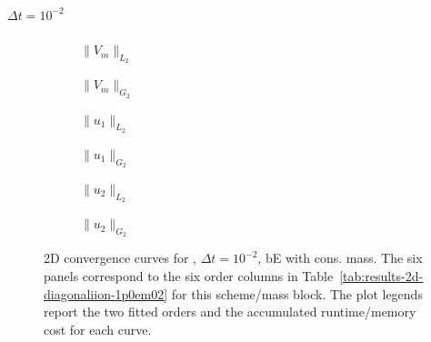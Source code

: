 \subsubsection{}
\paragraph{$\Delta t=10^{-2}$}

\begin{figure}[p]
\centering
\begin{subfigure}{0.485\linewidth}
\centering
{}
\caption{$\|V_m\|_{L_2}$}
\label{fig:results-2d-diagonaliion-1p0em02-backwardeuler-consistent-a}
\end{subfigure}
\hfill
\begin{subfigure}{0.485\linewidth}
\centering
{}
\caption{$\|V_m\|_{G_2}$}
\label{fig:results-2d-diagonaliion-1p0em02-backwardeuler-consistent-b}
\end{subfigure}
\par\vspace{0.8em}
\begin{subfigure}{0.485\linewidth}
\centering
{}
\caption{$\|u_1\|_{L_2}$}
\label{fig:results-2d-diagonaliion-1p0em02-backwardeuler-consistent-c}
\end{subfigure}
\hfill
\begin{subfigure}{0.485\linewidth}
\centering
{}
\caption{$\|u_1\|_{G_2}$}
\label{fig:results-2d-diagonaliion-1p0em02-backwardeuler-consistent-d}
\end{subfigure}
\par\vspace{0.8em}
\begin{subfigure}{0.485\linewidth}
\centering
{}
\caption{$\|u_2\|_{L_2}$}
\label{fig:results-2d-diagonaliion-1p0em02-backwardeuler-consistent-e}
\end{subfigure}
\hfill
\begin{subfigure}{0.485\linewidth}
\centering
{}
\caption{$\|u_2\|_{G_2}$}
\label{fig:results-2d-diagonaliion-1p0em02-backwardeuler-consistent-f}
\end{subfigure}
\caption{2D convergence curves for , $\Delta t=10^{-2}$, bE with cons. mass. The six panels correspond to the six order columns in Table~\ref{tab:results-2d-diagonaliion-1p0em02} for this scheme/mass block. The plot legends report the two fitted orders and the accumulated runtime/memory cost for each curve.}
\label{fig:results-2d-diagonaliion-1p0em02-backwardeuler-consistent}
\end{figure}
\FloatBarrier

